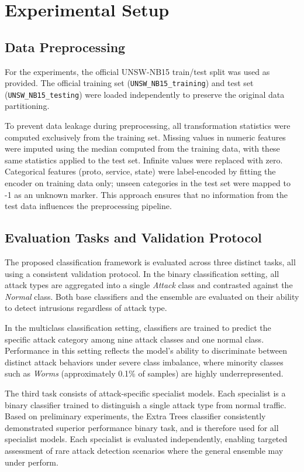 \documentclass[pdflatex,sn-mathphys-num]{sn-jnl}
\theoremstyle{thmstyleone}%
\theoremstyle{thmstyletwo}%
\theoremstyle{thmstylethree}%
\begin{document}
\section{Experimental Setup}
\subsection{Data Preprocessing}
For the experiments, the official UNSW-NB15 train/test split was used as provided. The official training set (\texttt{UNSW\_NB15\_training}) and test set (\texttt{UNSW\_NB15\_testing}) were loaded independently to preserve the original data partitioning.

To prevent data leakage during preprocessing, all transformation statistics were computed exclusively from the training set. Missing values in numeric features were imputed using the median computed from the training data, with these same statistics applied to the test set. Infinite values were replaced with zero. Categorical features (proto, service, state) were label-encoded by fitting the encoder on training data only; unseen categories in the test set were mapped to -1 as an unknown marker. This approach ensures that no information from the test data influences the preprocessing pipeline.

\subsection{Evaluation Tasks and Validation Protocol}

The proposed classification framework is evaluated across three distinct tasks, all using a consistent validation protocol. In the binary classification setting, all attack types are aggregated into a single \textit{Attack} class and contrasted against the \textit{Normal} class. Both base classifiers and the ensemble are evaluated on their ability to detect intrusions regardless of attack type.

In the multiclass classification setting, classifiers are trained to predict the specific attack category among nine attack classes and one normal class. Performance in this setting reflects the model’s ability to discriminate between distinct attack behaviors under severe class imbalance, where minority classes such as \textit{Worms} (approximately 0.1\% of samples) are highly underrepresented.

The third task consists of attack-specific specialist models. Each specialist is a binary classifier trained to distinguish a single attack type from normal traffic. Based on preliminary experiments, the Extra Trees classifier consistently demonstrated superior performance binary task, and is therefore used for all specialist models. Each specialist is evaluated independently, enabling targeted assessment of rare attack detection scenarios where the general ensemble may under perform.
\end{document}
